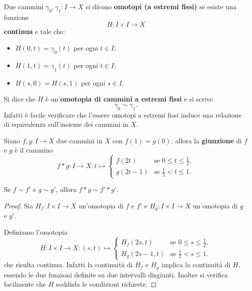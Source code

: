 \documentclass[]{article}
\begin{document}
    \begin{definition} \nl
        Due cammini $\gamma_0, \gamma_1: I \to X$ si dicono \textbf{omotopi (a estremi fissi)} se esiste una funzione
        \[
            H: I \times I \to X
        \]
        \textbf{continua} e tale che:
        \begin{itemize}
            \item $H(0,t) = \gamma_0(t)$ per ogni $t \in I$;
            \item $H(1,t) = \gamma_1(t)$ per ogni $t \in I$;
            \item $H(s,0) = H(s,1)$ per ogni $s \in I$.
        \end{itemize}
        Si dice che $H$ è un'\textbf{omotopia di cammini a estremi fissi} e si scrive
        \[
            \gamma_0 \sim \gamma_1.
        \] 
        Infatti è facile verificare che l'essere omotopi a estremi fissi induce una relazione di equivalenza
        sull'insieme dei cammini in $X$.
    \end{definition}

    \begin{definition}  \nl
        Siano $f,g: I \to X$ due cammini in $X$ con $f(1) = g(0)$, allora la \textbf{giunzione} di $f$ e $g$ è il cammino
        \[
            f * g: I \to X: t \mapsto 
            \begin{cases}
                f(2t) & \text{se } 0 \leq t \leq \frac{1}{2}, \\
                g(2t-1) & \text{se } \frac{1}{2} < t \leq 1.
            \end{cases}
        \]
    \end{definition}

    \begin{lemma}  \nl
        Se $f \sim f'$ e $g \sim g'$, allora $f * g \sim f' * g'$.
    \end{lemma}

    \begin{proof}
            Sia $H_f: I \times I \to X$ un'omotopia di $f$ e $f'$ e $H_g: I \times I \to X$ un'omotopia di $g$ e $g'$.

            Definiamo l'omotopia
            \[
                H: I \times I \to X: (s,t) \mapsto 
                \begin{cases}
                    H_f(2s,t) & \text{se } 0 \leq s \leq \frac{1}{2}, \\
                    H_g(2s-1,t) & \text{se } \frac{1}{2} < s \leq 1.
                \end{cases}
            \]
            che risulta continua. Infatti la continuità di $H_f$ e $H_g$ implica la continuità di $H$, essendo le due funzioni
            definite su due intervalli disgiunti. Inoltre si verifica facilmente che $H$ soddisfa le condizioni richieste.
    \end{proof}
\end{document}
